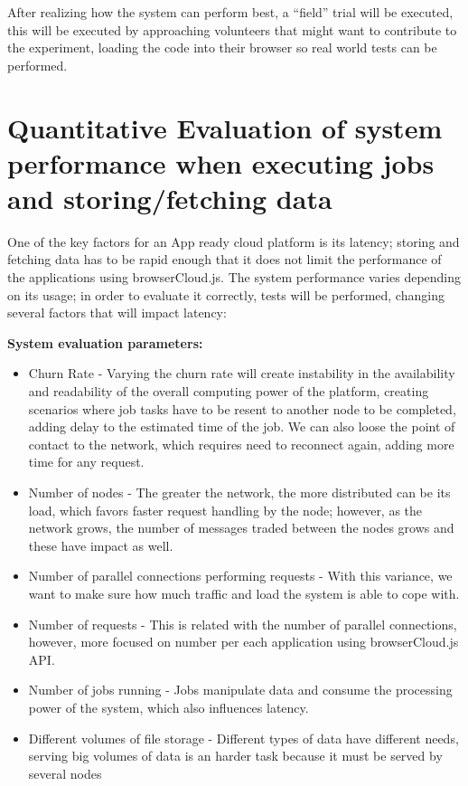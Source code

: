 After realizing how the system can perform best, a ``field'' trial will be executed, this will be executed by approaching volunteers that might want to contribute to the experiment, loading the code into their browser so real world tests can be performed.

\section{Quantitative Evaluation of system performance when executing jobs and storing/fetching data}

One of the key factors for an App ready cloud platform is its latency; storing and fetching data has to be rapid enough that it does not limit the performance of the applications using browserCloud.js. The system performance varies depending on its usage; in order to evaluate it correctly, tests will be performed, changing several factors that will impact latency:

\textbf{System evaluation parameters:}
\begin{itemize}
  \item Churn Rate - Varying the churn rate will create instability in the availability and readability of the overall computing power of the platform, creating scenarios where job tasks have to be resent to another node to be completed, adding delay to the estimated time of the job. We can also loose the point of contact to the network, which requires need to reconnect again, adding more time for any request.
  \item Number of nodes - The greater the network, the more distributed can be its load, which favors faster request handling by the node; however, as the network grows, the number of messages traded between the nodes grows and these have impact as well. 
  \item Number of parallel connections performing requests - With this variance, we want to make sure how much traffic and load the system is able to cope with.
  \item Number of requests - This is related with the number of parallel connections, however, more focused on number per each application using browserCloud.js API.
  \item Number of jobs running - Jobs manipulate data and consume the processing power of the system, which also influences latency.
  \item Different volumes of file storage - Different types of data have different needs, serving big volumes of data is an harder task because it must be served by several nodes
\end{itemize}

